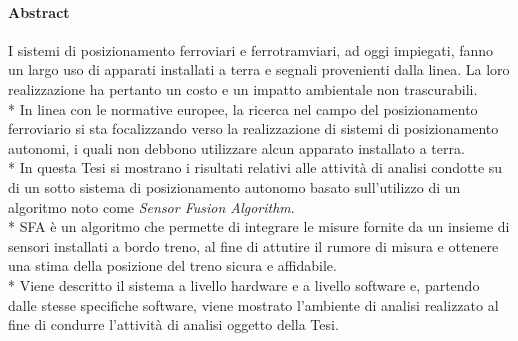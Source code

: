 \paragraph{Abstract}
I sistemi di posizionamento ferroviari e ferrotramviari, ad oggi impiegati, fanno un largo uso di apparati installati a terra e segnali provenienti dalla linea. La loro realizzazione ha pertanto un costo e un impatto ambientale non trascurabili.\\*
In linea con le normative europee, la ricerca nel campo del posizionamento ferroviario si sta focalizzando verso la realizzazione di sistemi di posizionamento autonomi, i quali non debbono utilizzare alcun apparato installato a terra.\\*
In questa Tesi si mostrano i risultati relativi alle attivit\`a di analisi condotte su di un sotto sistema di posizionamento autonomo basato sull'utilizzo di un algoritmo noto come \emph{Sensor Fusion Algorithm}.\\*
SFA \`e un algoritmo che permette di integrare le misure fornite da un insieme di sensori installati a bordo treno, al fine di attutire il rumore di misura e ottenere una stima della posizione del treno sicura e affidabile.\\*
Viene descritto il sistema a livello hardware e a livello software e, partendo dalle stesse specifiche software, viene mostrato l'ambiente di analisi realizzato al fine di condurre l'attivit\`a di analisi oggetto della Tesi.